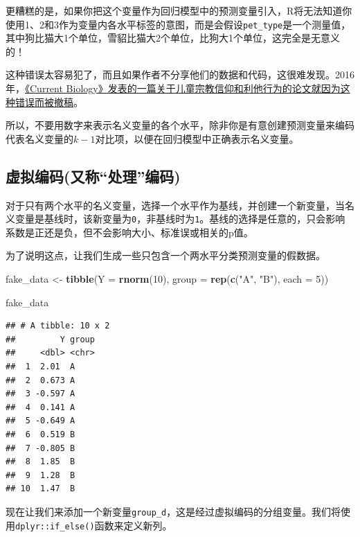 \documentclass[
]{book}
\newenvironment{Shaded}{\begin{snugshade}}{\end{snugshade}}
\newcommand{\AttributeTok}[1]{\textcolor[rgb]{0.13,0.29,0.53}{#1}}
\newcommand{\DecValTok}[1]{\textcolor[rgb]{0.00,0.00,0.81}{#1}}
\newcommand{\FunctionTok}[1]{\textcolor[rgb]{0.13,0.29,0.53}{\textbf{#1}}}
\newcommand{\NormalTok}[1]{#1}
\newcommand{\OtherTok}[1]{\textcolor[rgb]{0.56,0.35,0.01}{#1}}
\newcommand{\StringTok}[1]{\textcolor[rgb]{0.31,0.60,0.02}{#1}}
\begin{document}
更糟糕的是，如果你把这个变量作为回归模型中的预测变量引入，R将无法知道你使用1、2和3作为变量内各水平标签的意图，而是会假设\texttt{pet\_type}是一个测量值，其中狗比猫大1个单位，雪貂比猫大2个单位，比狗大1个单位，这完全是无意义的！

这种错误太容易犯了，而且如果作者不分享他们的数据和代码，这很难发现。2016年，\href{https://www.sciencedirect.com/science/article/pii/S0960982216306704}{《Current Biology》发表的一篇关于儿童宗教信仰和利他行为的论文就因为这种错误而被撤稿}。

所以，不要用数字来表示名义变量的各个水平，除非你是有意创建预测变量来编码代表名义变量的\(k-1\)对比项，以便在回归模型中正确表示名义变量。

\hypertarget{ux865aux62dfux7f16ux7801ux53c8ux79f0ux5904ux7406ux7f16ux7801}{%
\subsection{虚拟编码(又称``处理''编码)}\label{ux865aux62dfux7f16ux7801ux53c8ux79f0ux5904ux7406ux7f16ux7801}}

对于只有两个水平的名义变量，选择一个水平作为基线，并创建一个新变量，当名义变量是基线时，该新变量为\texttt{0}，非基线时为\texttt{1}。基线的选择是任意的，只会影响系数是正还是负，但不会影响大小、标准误或相关的p值。

为了说明这点，让我们生成一些只包含一个两水平分类预测变量的假数据。

\begin{Shaded}
\begin{Highlighting}[]
\NormalTok{fake\_data }\OtherTok{\textless{}{-}} \FunctionTok{tibble}\NormalTok{(}\AttributeTok{Y =} \FunctionTok{rnorm}\NormalTok{(}\DecValTok{10}\NormalTok{),}
                    \AttributeTok{group =} \FunctionTok{rep}\NormalTok{(}\FunctionTok{c}\NormalTok{(}\StringTok{"A"}\NormalTok{, }\StringTok{"B"}\NormalTok{), }\AttributeTok{each =} \DecValTok{5}\NormalTok{))}

\NormalTok{fake\_data}
\end{Highlighting}
\end{Shaded}

\begin{verbatim}
## # A tibble: 10 x 2
##         Y group
##     <dbl> <chr>
##  1  2.01  A    
##  2  0.673 A    
##  3 -0.597 A    
##  4  0.141 A    
##  5 -0.649 A    
##  6  0.519 B    
##  7 -0.805 B    
##  8  1.85  B    
##  9  1.28  B    
## 10  1.47  B
\end{verbatim}

现在让我们来添加一个新变量\texttt{group\_d}，这是经过虚拟编码的分组变量。我们将使用\texttt{dplyr::if\_else()}函数来定义新列。
\end{document}
